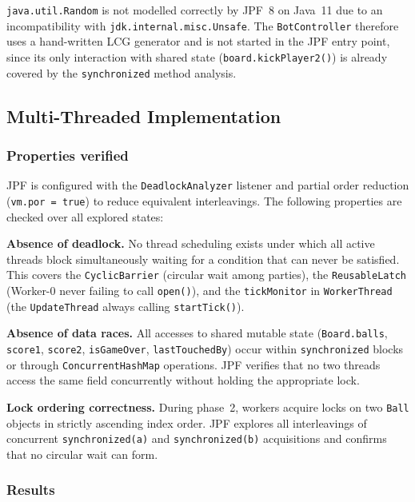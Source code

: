 \documentclass[12pt,a4paper]{article}
\begin{document}
\texttt{java.util.Random} is not modelled correctly by JPF~8 on Java~11
due to an incompatibility with \texttt{jdk.internal.misc.Unsafe}. The
\texttt{BotController} therefore uses a hand-written LCG generator and is
not started in the JPF entry point, since its only interaction with shared
state (\texttt{board.kickPlayer2()}) is already covered by the
\texttt{synchronized} method analysis.

\subsection{Multi-Threaded Implementation}

\subsubsection*{Properties verified}

JPF is configured with the \texttt{DeadlockAnalyzer} listener and partial
order reduction (\texttt{vm.por = true}) to reduce equivalent interleavings.
The following properties are checked over all explored states:

\textbf{Absence of deadlock.} No thread scheduling exists under which all
active threads block simultaneously waiting for a condition that can never
be satisfied. This covers the \texttt{CyclicBarrier} (circular wait among
parties), the \texttt{ReusableLatch} (Worker-0 never failing to call
\texttt{open()}), and the \texttt{tickMonitor} in \texttt{WorkerThread}
(the \texttt{UpdateThread} always calling \texttt{startTick()}).

\textbf{Absence of data races.} All accesses to shared mutable state
(\texttt{Board.balls}, \texttt{score1}, \texttt{score2},
\texttt{isGameOver}, \texttt{lastTouchedBy}) occur within
\texttt{synchronized} blocks or through \texttt{ConcurrentHashMap}
operations. JPF verifies that no two threads access the same field
concurrently without holding the appropriate lock.

\textbf{Lock ordering correctness.} During phase~2, workers acquire
locks on two \texttt{Ball} objects in strictly ascending index order.
JPF explores all interleavings of concurrent \texttt{synchronized(a)}
and \texttt{synchronized(b)} acquisitions and confirms that no circular
wait can form.

\subsubsection*{Results}
\end{document}
